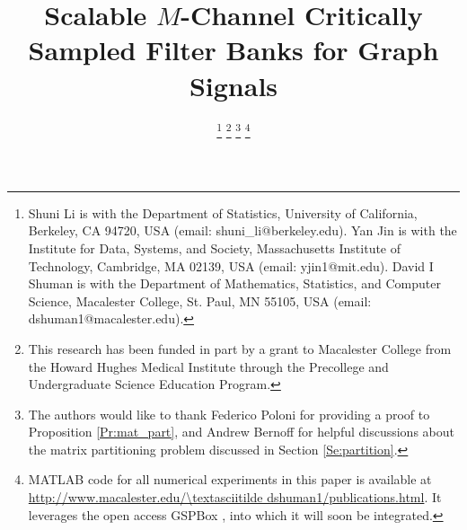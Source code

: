 \documentclass[journal, 10pt]{IEEEtran}
\begin{document}
\title{
Scalable $M$-Channel Critically Sampled Filter Banks for Graph Signals 
}
\author{
\thanks{Shuni Li is with the Department of Statistics, University of California, Berkeley, CA 94720, USA (email: shuni\_li@berkeley.edu). Yan Jin is with the Institute for Data, Systems, and Society, Massachusetts Institute of Technology, Cambridge, MA 02139, USA (email: yjin1@mit.edu). David I Shuman is with the Department of Mathematics, Statistics, and Computer Science, Macalester College, St. Paul, MN 55105, USA (email: dshuman1@macalester.edu).}
\thanks{This research has been funded in part by a grant to Macalester College from the Howard Hughes Medical Institute through the Precollege and Undergraduate Science Education Program.}
\thanks{The authors would like to thank Federico Poloni for providing a proof to Proposition \ref{Pr:mat_part}, and Andrew Bernoff for helpful discussions about the matrix partitioning problem discussed in Section \ref{Se:partition}.}
\thanks{MATLAB code for all numerical experiments in this paper is available at \url{http://www.macalester.edu/\textasciitilde dshuman1/publications.html}. It leverages the open access GSPBox \cite{gspbox}, into which it will soon be integrated.}}

\maketitle
\end{document}
